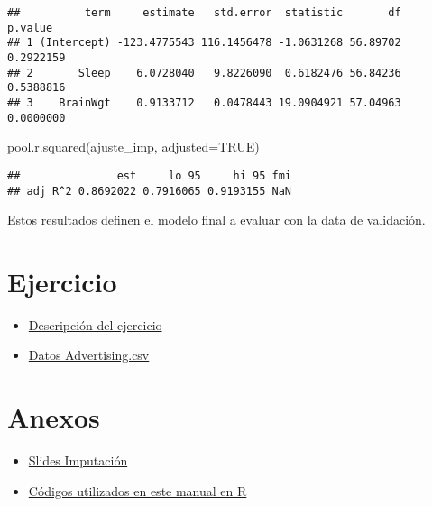\documentclass[
]{article}
\newenvironment{Shaded}{\begin{snugshade}}{\end{snugshade}}
\newcommand{\AttributeTok}[1]{\textcolor[rgb]{0.77,0.63,0.00}{#1}}
\newcommand{\ConstantTok}[1]{\textcolor[rgb]{0.00,0.00,0.00}{#1}}
\newcommand{\FunctionTok}[1]{\textcolor[rgb]{0.00,0.00,0.00}{#1}}
\newcommand{\NormalTok}[1]{#1}
\begin{document}
\begin{verbatim}
##          term     estimate   std.error  statistic       df   p.value
## 1 (Intercept) -123.4775543 116.1456478 -1.0631268 56.89702 0.2922159
## 2       Sleep    6.0728040   9.8226090  0.6182476 56.84236 0.5388816
## 3    BrainWgt    0.9133712   0.0478443 19.0904921 57.04963 0.0000000
\end{verbatim}

\begin{Shaded}
\begin{Highlighting}[]
\FunctionTok{pool.r.squared}\NormalTok{(ajuste\_imp, }\AttributeTok{adjusted=}\ConstantTok{TRUE}\NormalTok{)}
\end{Highlighting}
\end{Shaded}

\begin{verbatim}
##               est     lo 95     hi 95 fmi
## adj R^2 0.8692022 0.7916065 0.9193155 NaN
\end{verbatim}

Estos resultados definen el modelo final a evaluar con la data de
validación.

\hypertarget{ejercicio}{%
\section{Ejercicio}\label{ejercicio}}

\begin{itemize}
\item
  \href{files/EjercicioImputacion1.pdf}{Descripción del ejercicio}
\item
  \href{files/Advertising.csv}{Datos Advertising.csv}
\end{itemize}

\hypertarget{anexos}{%
\section{Anexos}\label{anexos}}

\begin{itemize}
\item
  \href{files/3_Tratamiento\%20de\%20datos\%20perdidos.pdf}{Slides
  Imputación}
\item
  \href{files/GuiaRImputacion_20210904.R}{Códigos utilizados en este
  manual en R}
\end{itemize}
\end{document}
